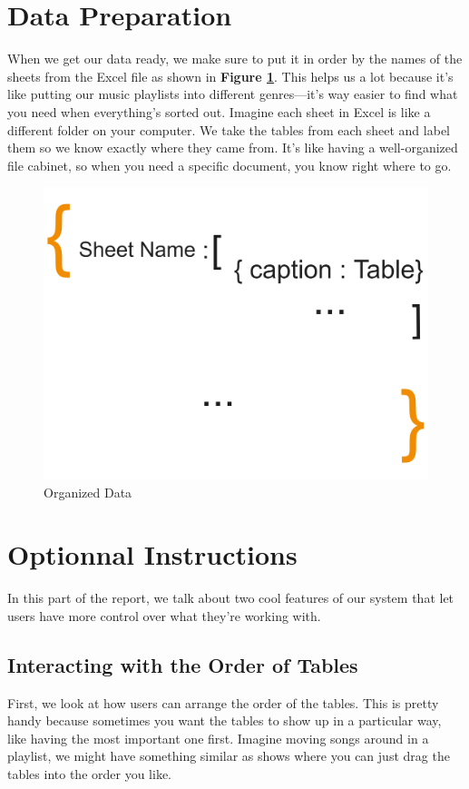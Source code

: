 \section{Data Preparation}
When we get our data ready, we make sure to put it in order by the names of the sheets from the Excel file as shown in \textbf{Figure \ref{fig:org}}. This helps us a lot because it's like putting our music playlists into different genres—it's way easier to find what you need when everything's sorted out.
\vskip 0.5cm
Imagine each sheet in Excel is like a different folder on your computer. We take the tables from each sheet and label them so we know exactly where they came from. It's like having a well-organized file cabinet, so when you need a specific document, you know right where to go.

\begin{figure}[H]
    \centering
    \includegraphics[width=0.4 \linewidth]{assets/organizedJson.png}
    \caption{Organized Data}
    \label{fig:org}
\end{figure}



\section{Optionnal Instructions}
In this part of the report, we talk about two cool features of our system that let users have more control over what they're working with.

\subsection{Interacting with the Order of Tables}
First, we look at how users can arrange the order of the tables. This is pretty handy because sometimes you want the tables to show up in a particular way, like having the most important one first.
\vskip 0.5cm
Imagine moving songs around in a playlist, we might have something similar as shows where you can just drag the tables into the order you like.

